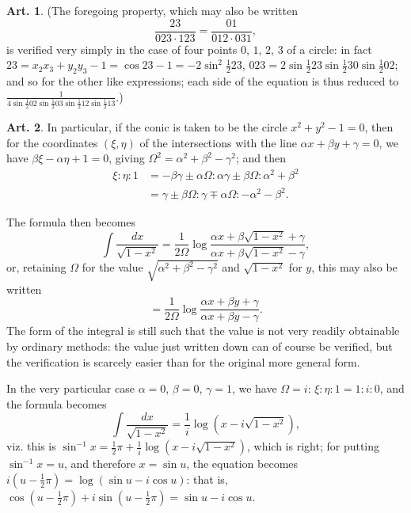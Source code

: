 \documentclass[12pt,a4paper]{article}
\theoremstyle{definition}
\newtheorem{art}{Art.}[section]
\begin{document}
\begin{art}\label{art:97}
(The foregoing property, which may also be written
\[
\frac{23}{023 \cdot 123} = \frac{01}{012 \cdot 031},
\]
is verified very simply in the case of four points $0$, $1$, $2$, $3$ of a circle: in fact $23 = x_2x_3 + y_2y_3 - 1 = \cos 23 - 1 = -2\sin^2 \frac{1}{2}23$, $023 = 2\sin \frac{1}{2}23 \sin \frac{1}{2}30 \sin \frac{1}{2}02$; and so for the other like expressions; each side of the equation is thus reduced to $\frac{1}{4\sin \frac{1}{2}02 \sin \frac{1}{2}03 \sin \frac{1}{2}12 \sin \frac{1}{2}13}$.)
\end{art}

\begin{art}\label{art:98}
In particular, if the conic is taken to be the circle $x^2 + y^2 - 1 = 0$, then for the coordinates $(\xi, \eta)$ of the intersections with the line $\alpha x + \beta y + \gamma = 0$, we have $\beta\xi - \alpha\eta + 1 = 0$, giving $\Omega^2 = \alpha^2 + \beta^2 - \gamma^2$; and then
\begin{align*}
\xi : \eta : 1 &= -\beta\gamma \pm \alpha\Omega : \alpha\gamma \pm \beta\Omega : \alpha^2 + \beta^2 \\
&= \gamma \pm \beta\Omega : \gamma \mp \alpha\Omega : -\alpha^2 - \beta^2.
\end{align*}

The formula then becomes
\[
\int \frac{dx}{\sqrt{1 - x^2}} = \frac{1}{2\Omega}\log\frac{\alpha x + \beta\sqrt{1 - x^2} + \gamma}{\alpha x + \beta\sqrt{1 - x^2} - \gamma},
\]
or, retaining $\Omega$ for the value $\sqrt{\alpha^2 + \beta^2 - \gamma^2}$ and $\sqrt{1 - x^2}$ for $y$, this may also be written
\[
= \frac{1}{2\Omega}\log\frac{\alpha x + \beta y + \gamma}{\alpha x + \beta y - \gamma}.
\]
The form of the integral is still such that the value is not very readily obtainable by ordinary methods: the value just written down can of course be verified, but the verification is scarcely easier than for the original more general form.
\end{art}



\newpage
In the very particular case $\alpha = 0$, $\beta = 0$, $\gamma = 1$, we have $\Omega = i$: $\xi : \eta : 1 = 1 : i : 0$, and the formula becomes
\[
\int \frac{dx}{\sqrt{1 - x^2}} = \frac{1}{i}\log(x - i\sqrt{1 - x^2}),
\]
viz. this is $\sin^{-1}x = \frac{1}{2}\pi + \frac{1}{i}\log(x - i\sqrt{1 - x^2})$, which is right; for putting $\sin^{-1}x = u$, and therefore $x = \sin u$, the equation becomes $i(u - \frac{1}{2}\pi) = \log(\sin u - i\cos u)$: that is, $\cos(u - \frac{1}{2}\pi) + i\sin(u - \frac{1}{2}\pi) = \sin u - i\cos u$.
\end{document}
